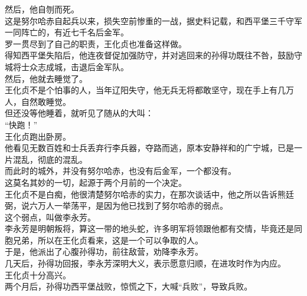 \begin{multicols}{\theparacolNo}
然后，他自刎而死。\\

这是努尔哈赤自起兵以来，损失空前惨重的一战，据史料记载，和西平堡三千守军一同阵亡的，有近七千名后金军。\\

罗一贯尽到了自己的职责，王化贞也准备这样做。\\

得知西平堡失陷后，他连夜督促加强防守，并对逃回来的孙得功既往不咎，鼓励守城将士众志成城，击退后金军队。\\

然后，他就去睡觉了。\\

王化贞不是个怕事的人，当年辽阳失守，他无兵无将都敢坚守，现在手上有几万人，自然敢睡觉。\\

但还没等他睡着，就听见了随从的大叫：\\

“快跑！”\\

王化贞跑出卧房。\\

他看见无数百姓和士兵丢弃行李兵器，夺路而逃，原本安静祥和的广宁城，已是一片混乱，彻底的混乱。\\

而此时的城外，并没有努尔哈赤，也没有后金军，一个都没有。\\

这莫名其妙的一切，起源于两个月前的一个决定。\\

王化贞不是白痴，他很清楚努尔哈赤的实力，在那次谈话中，他之所以告诉熊廷弼，说六万人一举荡平，是因为他已找到了努尔哈赤的弱点。\\

这个弱点，叫做李永芳。\\

李永芳是明朝叛将，算这一带的地头蛇，许多明军将领跟他都有交情，毕竟还是同胞兄弟，所以在王化贞看来，这是一个可以争取的人。\\

于是，他派出了心腹孙得功，前往敌营，劝降李永芳。\\

几天后，孙得功回报，李永芳深明大义，表示愿意归顺，在进攻时作为内应。\\

王化贞十分高兴。\\

两个月后，孙得功西平堡战败，惊慌之下，大喊“兵败”，导致兵败。\\


\end{multicols}

